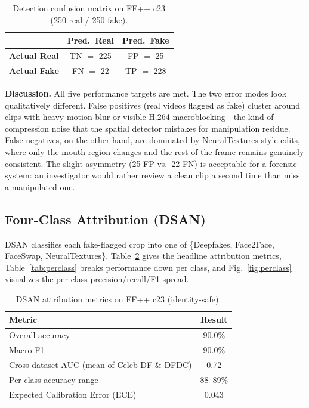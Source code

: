 \begin{table}[!t]
\centering
\caption{Detection confusion matrix on FF++ c23 (250 real / 250 fake).}
\label{tab:det_cm}
\begin{tabular}{@{}lcc@{}}
\toprule
 & \textbf{Pred.\ Real} & \textbf{Pred.\ Fake} \\
\midrule
\textbf{Actual Real} & TN $=$ 225 & FP $=$ 25 \\
\textbf{Actual Fake} & FN $=$ 22 & TP $=$ 228 \\
\bottomrule
\end{tabular}
\end{table}

\textbf{Discussion.}  All five performance targets are met. The two error modes look qualitatively different. False positives (real videos flagged as fake) cluster around clips with heavy motion blur or visible H.264 macroblocking - the kind of compression noise that the spatial detector mistakes for manipulation residue. False negatives, on the other hand, are dominated by NeuralTextures-style edits, where only the mouth region changes and the rest of the frame remains genuinely consistent. The slight asymmetry (25 FP vs.\ 22 FN) is acceptable for a forensic system: an investigator would rather review a clean clip a second time than miss a manipulated one.

\subsection{Four-Class Attribution (DSAN)}
\label{sec:attribution}

DSAN classifies each fake-flagged crop into one of \{Deepfakes, Face2Face, FaceSwap, NeuralTextures\}. Table~\ref{tab:attr_overall} gives the headline attribution metrics, Table~\ref{tab:perclass} breaks performance down per class, and Fig.~\ref{fig:perclass} visualizes the per-class precision/recall/F1 spread.

\begin{table}[!t]
\centering
\caption{DSAN attribution metrics on FF++ c23 (identity-safe).}
\label{tab:attr_overall}
\begin{tabular}{@{}lc@{}}
\toprule
\textbf{Metric} & \textbf{Result} \\
\midrule
Overall accuracy & 90.0\% \\
Macro F1         & 90.0\% \\
Cross-dataset AUC (mean of Celeb-DF \& DFDC) & 0.72 \\
Per-class accuracy range & 88--89\% \\
Expected Calibration Error (ECE) & 0.043 \\
\bottomrule
\end{tabular}
\end{table}

